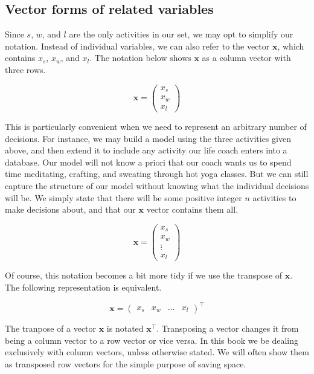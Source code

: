 \subsection{Vector forms of related variables}

Since $s$, $w$, and $l$ are the only activities in our set, we may opt to simplify our notation. Instead of individual variables, we can also refer to the vector $\mathbf{x}$, which contains $x_s$, $x_w$, and $x_l$. The notation below shows $\mathbf{x}$ as a column vector with three rows.

$$
\mathbf{x} = \left(
	\begin{array}{c}
		x_s \\ 
		x_w \\ 
		x_l
	\end{array}
\right)
$$

This is particularly convenient when we need to represent an arbitrary number of decisions. For instance, we may build a model using the three activities given above, and then extend it to include any activity our life coach enters into a database. Our model will not know a priori that our coach wants us to spend time meditating, crafting, and sweating through hot yoga classes. But we can still capture the structure of our model without knowing what the individual decisions will be. We simply state that there will be some positive integer $n$ activities to make decisions about, and that our $\mathbf{x}$ vector contains them all.

$$
\mathbf{x} = \begin{pmatrix}
		x_s \\ 
		x_w \\ 
		\vdots \\
		x_l
	\end{pmatrix}
$$

Of course, this notation becomes a bit more tidy if we use the transpose of $\mathbf{x}$. The following representation is equivalent.

$$
\mathbf{x} = \begin{pmatrix}
	x_s & x_w & \dots & x_l
\end{pmatrix}^\intercal
$$

The tranpose of a vector $\mathbf{x}$ is notated $\mathbf{x}^\intercal$. Transposing a vector changes it from being a column vector to a row vector or vice versa. In this book we be dealing exclusively with column vectors, unless otherwise stated. We will often show them as transposed row vectors for the simple purpose of saving space.


